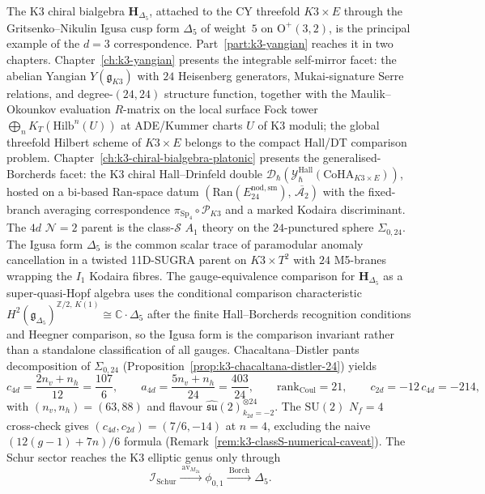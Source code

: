 The K3 chiral bialgebra $\mathbf{H}_{\Delta_5}$, attached to the CY threefold
$K3 \times E$ through the Gritsenko--Nikulin Igusa cusp form $\Delta_5$ of weight~$5$
on $\mathrm{O}^+(3,2)$, is the principal example of the \(d=3\) correspondence. Part~\ref{part:k3-yangian}
reaches it in two chapters.
Chapter~\ref{ch:k3-yangian} presents the integrable self-mirror facet: the
abelian Yangian $Y(\mathfrak{g}_{K3})$ with $24$ Heisenberg generators, Mukai-signature
Serre relations, and degree-$(24,24)$ structure function, together with the
Maulik--Okounkov evaluation $R$-matrix on the local surface Fock tower
$\bigoplus_n K_T(\mathrm{Hilb}^n(U))$ at ADE/Kummer charts \(U\) of K3 moduli; the global threefold Hilbert scheme of \(K3\times E\) belongs to the compact Hall/DT comparison problem.
Chapter~\ref{ch:k3-chiral-bialgebra-platonic} presents the
generalised-Borcherds facet: the K3 chiral Hall--Drinfeld double
$\mathcal{D}_\hbar(\mathcal{Y}^{\mathrm{Hall}}_\hbar(\mathrm{CoHA}_{K3\times E}))$,
hosted on a bi-based Ran-space datum $(\mathrm{Ran}(E^{\mathrm{nod,sm}}_{24}),\,
\overline{\mathcal{A}_2})$ with the fixed-branch averaging correspondence
\(\pi_{\mathrm{Sp}_4}\circ\mathscr P_{K3}\) and a marked Kodaira discriminant. The $4d$ $\mathcal{N}=2$ parent is the class-$\mathcal{S}$ $A_1$ theory on
the $24$-punctured sphere $\Sigma_{0,24}$. The Igusa form $\Delta_5$ is
the common scalar trace of paramodular anomaly cancellation in a
twisted 11D-SUGRA parent on $K3\times T^2$ with $24$ M5-branes wrapping
the $I_1$ Kodaira fibres. The gauge-equivalence comparison for
$\mathbf{H}_{\Delta_5}$ as a super-quasi-Hopf algebra uses the
conditional comparison characteristic
$H^2(\mathfrak{g}_{\Delta_5})^{\mathbb{Z}/2,\, K(1)}
\cong \mathbb{C}\cdot\Delta_5$ after the finite Hall--Borcherds
recognition conditions and Heegner comparison, so the Igusa form is the
comparison invariant rather than a standalone classification of all
gauges. Chacaltana--Distler pants decomposition of
$\Sigma_{0,24}$ (Proposition~\ref{prop:k3-chacaltana-distler-24}) yields
\[
 c_{4d} = \frac{2n_v + n_h}{12} = \frac{107}{6},
 \qquad
 a_{4d} = \frac{5n_v + n_h}{24} = \frac{403}{24},
 \qquad
 \mathrm{rank}_{\mathrm{Coul}} = 21,
 \qquad
 c_{2d} = -12\,c_{4d} = -214,
\]
with $(n_v, n_h) = (63, 88)$ and flavour
$\widehat{\mathfrak{su}}(2)^{\otimes 24}_{k_{2d} = -2}$. The
$\mathrm{SU}(2)$ $N_f = 4$ cross-check gives
$(c_{4d}, c_{2d}) = (7/6, -14)$ at $n = 4$, excluding the naive
$(12(g-1) + 7n)/6$ formula
(Remark~\ref{rem:k3-classS-numerical-caveat}).
The Schur sector reaches the K3 elliptic genus only through
\[
 \mathcal{I}_{\mathrm{Schur}}
 \xrightarrow{\ \mathrm{av}_{M_{24}}\ }
 \phi_{0,1}
 \xrightarrow{\ \mathrm{Borch}\ }
 \Delta_5.
\]

